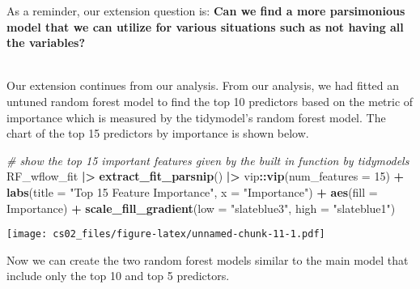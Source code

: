 \documentclass[
]{article}
\newenvironment{Shaded}{\begin{snugshade}}{\end{snugshade}}
\newcommand{\AttributeTok}[1]{\textcolor[rgb]{0.13,0.29,0.53}{#1}}
\newcommand{\CommentTok}[1]{\textcolor[rgb]{0.56,0.35,0.01}{\textit{#1}}}
\newcommand{\DecValTok}[1]{\textcolor[rgb]{0.00,0.00,0.81}{#1}}
\newcommand{\FunctionTok}[1]{\textcolor[rgb]{0.13,0.29,0.53}{\textbf{#1}}}
\newcommand{\NormalTok}[1]{#1}
\newcommand{\SpecialCharTok}[1]{\textcolor[rgb]{0.81,0.36,0.00}{\textbf{#1}}}
\newcommand{\StringTok}[1]{\textcolor[rgb]{0.31,0.60,0.02}{#1}}
\begin{document}
As a reminder, our extension question is: \textbf{Can we find a more
parsimonious model that we can utilize for various situations such as
not having all the variables?}\\
\strut \\
Our extension continues from our analysis. From our analysis, we had
fitted an untuned random forest model to find the top 10 predictors
based on the metric of importance which is measured by the tidymodel's
random forest model. The chart of the top 15 predictors by importance is
shown below.

\begin{Shaded}
\begin{Highlighting}[]
\CommentTok{\# show the top 15 important features given by the built in function by tidymodels}
\NormalTok{RF\_wflow\_fit }\SpecialCharTok{|\textgreater{}} 
  \FunctionTok{extract\_fit\_parsnip}\NormalTok{() }\SpecialCharTok{|\textgreater{}} 
\NormalTok{  vip}\SpecialCharTok{::}\FunctionTok{vip}\NormalTok{(}\AttributeTok{num\_features =} \DecValTok{15}\NormalTok{) }\SpecialCharTok{+}
  \FunctionTok{labs}\NormalTok{(}\AttributeTok{title =} \StringTok{"Top 15 Feature Importance"}\NormalTok{, }\AttributeTok{x =} \StringTok{"Importance"}\NormalTok{) }\SpecialCharTok{+}
  \FunctionTok{aes}\NormalTok{(}\AttributeTok{fill =}\NormalTok{ Importance) }\SpecialCharTok{+} 
  \FunctionTok{scale\_fill\_gradient}\NormalTok{(}\AttributeTok{low =} \StringTok{"slateblue3"}\NormalTok{, }\AttributeTok{high =} \StringTok{"slateblue1"}\NormalTok{)}
\end{Highlighting}
\end{Shaded}

\texttt{[image: cs02\_files/figure-latex/unnamed-chunk-11-1.pdf]}

Now we can create the two random forest models similar to the main model
that include only the top 10 and top 5 predictors.
\end{document}
